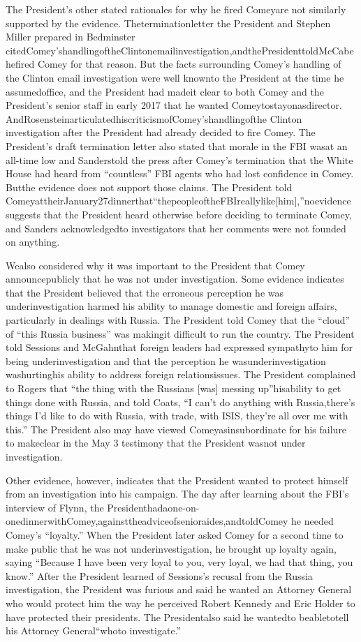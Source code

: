 {The President’s other stated rationales for why he fired Comeyare not similarly supported by the evidence. Theterminationletter the President and Stephen Miller prepared in Bedminster citedComey’shandlingoftheClintonemailinvestigation,andthePresidenttoldMcCabehefired Comey for that reason. But the facts surrounding Comey’s handling of the Clinton email investigation were well knownto the President at the time he assumedoffice, and the President had madeit clear to both Comey and the President’s senior staff in early 2017 that he wanted Comeytostayonasdirector. AndRosensteinarticulatedhiscriticismofComey’shandlingofthe Clinton investigation after the President had already decided to fire Comey. The President’s draft termination letter also stated that morale in the FBI wasat an all-time low and Sanderstold the press after Comey’s termination that the White House had heard from “countless” FBI agents who had lost confidence in Comey. Butthe evidence does not support those claims. The President told ComeyattheirJanuary27dinnerthat“thepeopleoftheFBIreallylike[him],”noevidence suggests that the President heard otherwise before deciding to terminate Comey, and Sanders acknowledgedto investigators that her comments were not founded on anything.

Wealso considered why it was important to the President that Comey announcepublicly that he was not under investigation. Some evidence indicates that the President believed that the erroneous perception he was underinvestigation harmed his ability to manage domestic and foreign affairs, particularly in dealings with Russia. The President told Comey that the “cloud” of “this Russia business” was makingit difficult to run the country. The President told Sessions and McGahnthat foreign leaders had expressed sympathyto him for being underinvestigation and that the perception he wasunderinvestigation washurtinghis ability to address foreign relationsissues. The President complained to Rogers that “the thing with the Russians [was] messing up”hisability to get things done with Russia, and told Coats, “I can’t do anything with Russia,there’s things I'd
like to do with Russia, with trade, with ISIS, they’re all over me with this.” The President also may have viewed Comeyasinsubordinate for his failure to makeclear in the May 3 testimony that the President wasnot under investigation.

Other evidence, however, indicates that the President wanted to protect himself from an investigation into his campaign. The day after learning about the FBI’s interview of Flynn, the Presidenthadaone-on-onedinnerwithComey,againsttheadviceofsenioraides,andtoldComey he needed Comey’s “loyalty.” When the President later asked Comey for a second time to make public that he was not underinvestigation, he brought up loyalty again, saying “Because I have been very loyal to you, very loyal, we had that thing, you know.” After the President learned of Sessions’s recusal from the Russia investigation, the President was furious and said he wanted an Attorney General who would protect him the way he perceived Robert Kennedy and Eric Holder to have protected their presidents. The Presidentalso said he wantedto beabletotell his Attorney General“whoto investigate.”

}
